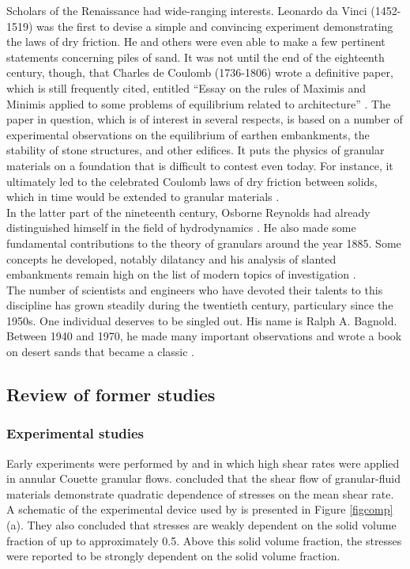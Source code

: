 Scholars of the Renaissance had wide-ranging interests. Leonardo
da Vinci (1452-1519) was the first to devise a simple and
convincing experiment demonstrating the laws of dry friction. He
and others were even able to make a few pertinent statements
concerning piles of sand. It was not until the end of the
eighteenth century, though, that Charles de Coulomb (1736-1806)
wrote a definitive paper, which is still frequently cited,
entitled ``Essay on the rules of Maximis and Minimis applied to
some problems of equilibrium related to architecture''
\citep{Cou73}. The paper in question, which is of interest in
several respects, is based on a number of experimental
observations on the equilibrium of earthen embankments, the
stability of stone structures, and other edifices. It puts the
physics of granular materials on a foundation that is difficult to
contest even today. For instance, it ultimately led to the
celebrated Coulomb laws of dry friction between solids, which in
time would be extended to granular materials \citep{Dur00}.\\

In the latter part of the nineteenth century, Osborne Reynolds had
already distinguished himself in the field of hydrodynamics
\citep{Rey85}. He also made some fundamental contributions to the
theory of granulars around the year 1885. Some concepts he
developed, notably dilatancy and his analysis of slanted
embankments remain high on the list of modern topics of
investigation \citep{Dur00}.\\

The number of scientists and engineers who have devoted their
talents to this discipline has grown steadily during the twentieth
century, particulary since the 1950s. One individual deserves to
be singled out. His name is Ralph A. Bagnold. Between 1940 and
1970, he made many important observations \citep{Bag54,Bag56} and
wrote a book on desert sands that became a classic
\citep{Bag41}.\\

\subsection{Review of former studies}

\subsubsection{Experimental studies}

Early experiments were performed by \cite{Sav84} and \cite{Han85}
in which high shear rates were applied in annular Couette granular
flows. \citeauthor{Han85} concluded that the shear flow of
granular-fluid materials demonstrate quadratic dependence of
stresses on the mean shear rate. A schematic of the experimental
device used by \citeauthor{Han85} is presented in Figure
\ref{figcomp}(a). They also concluded that stresses are weakly
dependent on the solid volume fraction of up to approximately 0.5.
Above this solid volume fraction, the stresses were reported to be
strongly dependent on
the solid volume fraction.\\

